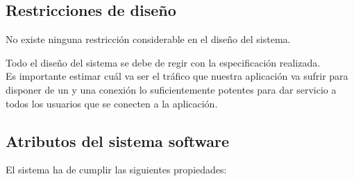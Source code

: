 \subsection{Restricciones de diseño}

No existe ninguna restricción considerable en el diseño del sistema.

Todo el diseño del sistema se debe de regir con la especificación
realizada.\\

Es importante estimar cuál va ser el tráfico que nuestra aplicación va sufrir
para disponer de un  y una conexión lo suficientemente
potentes para dar servicio a todos los usuarios que se conecten a la aplicación.

\subsection{Atributos del sistema software}
El sistema ha de cumplir las siguientes propiedades:

